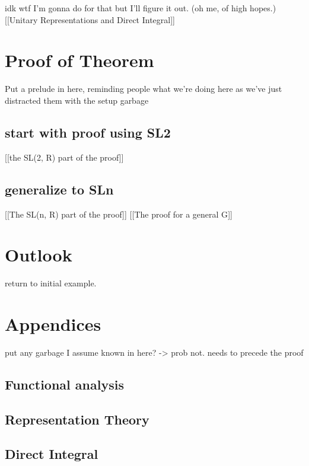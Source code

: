 \documentclass[
]{article}
\begin{document}
idk wtf I'm gonna do for that but I'll figure it out. (oh me, of high
hopes.) {[}{[}Unitary Representations and Direct Integral{]}{]}

\hypertarget{proof-of-theorem}{%
\section{Proof of Theorem}\label{proof-of-theorem}}

Put a prelude in here, reminding people what we're doing here as we've
just distracted them with the setup garbage

\hypertarget{start-with-proof-using-sl2}{%
\subsection{start with proof using
SL2}\label{start-with-proof-using-sl2}}

{[}{[}the SL(2, R) part of the proof{]}{]}

\hypertarget{generalize-to-sln}{%
\subsection{generalize to SLn}\label{generalize-to-sln}}

{[}{[}The SL(n, R) part of the proof{]}{]} {[}{[}The proof for a general
G{]}{]}

\hypertarget{outlook}{%
\section{Outlook}\label{outlook}}

return to initial example.

\hypertarget{appendices}{%
\section{Appendices}\label{appendices}}

put any garbage I assume known in here? -\textgreater{} prob not. needs
to precede the proof

\hypertarget{functional-analysis}{%
\subsection{Functional analysis}\label{functional-analysis}}

\hypertarget{representation-theory}{%
\subsection{Representation Theory}\label{representation-theory}}

\hypertarget{direct-integral}{%
\subsection{Direct Integral}\label{direct-integral}}
\end{document}
